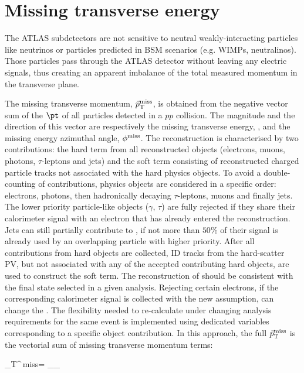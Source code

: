 \section{Missing transverse energy}
\label{chp:obj:met}

The ATLAS subdetectors are not sensitive to neutral weakly-interacting particles like neutrinos or particles predicted in BSM scenarios (e.g. WIMPs, neutralinos). Those particles pass through the ATLAS detector without leaving any electric signals, thus creating an apparent imbalance of
the total measured momentum in the transverse plane.\par The missing transverse momentum, $\vec{p}_{\rm T}^{\rm miss}$, is obtained from the negative vector sum of the $\pt$ of all particles detected in a $pp$ collision. The magnitude and the direction of this vector are respectively the missing transverse energy, \MET, and the missing energy azimuthal angle, $\phi^{\rm miss}$.
The \MET reconstruction \cite{ATL-PHYS-PUB-2015-023} is characterised by two contributions: the hard term from all reconstructed objects (electrons, muons, photons, $\tau$-leptons and jets) and the soft term consisting of reconstructed charged particle tracks not associated with the hard physics objects. To avoid a double-counting of contributions,  physics objects are considered in a specific order: electrons, photons, then hadronically decaying $\tau$-leptons, muons and finally jets. The lower priority particle-like objects ($\gamma$, $\tau$) are fully rejected if they share their calorimeter signal with an electron that has already entered the \MET reconstruction. Jets can still partially contribute to \MET, if not more than $50\%$ of their signal is already used by an overlapping particle with higher priority.
After all \MET contributions from hard objects are collected, ID tracks from the hard-scatter PV, but not associated with any of the accepted contributing hard objects, are used to construct the soft term.
The reconstruction of \MET should be consistent with the final state selected in a given analysis. Rejecting certain electrons, if the corresponding calorimeter signal is collected with the new assumption, can change the \MET.
The flexibility needed to re-calculate \MET under changing analysis requirements for the same event is implemented using dedicated variables corresponding to a specific object contribution. In this approach, the full $\vec{p}_{\rm T}^{\rm miss}$ is the vectorial sum of missing transverse momentum terms:

\be
{}_{\rm T}^{\,\rm miss}= _{}_{}
\label{eq:obj:met:metdef}
\ee

